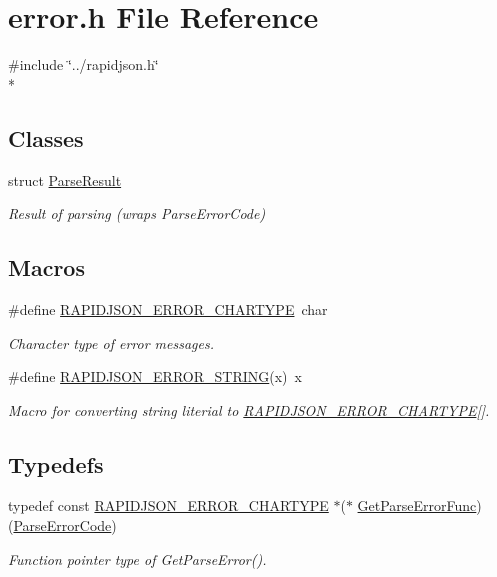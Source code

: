 \hypertarget{a00517}{}\section{error.\+h File Reference}
\label{a00517}
{\ttfamily \#include \char`\"{}../rapidjson.\+h\char`\"{}}\\*
\subsection*{Classes}
\begin{DoxyCompactItemize}
\item 
struct \hyperlink{a00230}{Parse\+Result}
\begin{DoxyCompactList}\small\item\em Result of parsing (wraps Parse\+Error\+Code) \end{DoxyCompactList}\end{DoxyCompactItemize}
\subsection*{Macros}
\begin{DoxyCompactItemize}
\item 
\#define \hyperlink{a00832_ga7e4636fd48d0148f102b8a13f0539d8c}{R\+A\+P\+I\+D\+J\+S\+O\+N\+\_\+\+E\+R\+R\+O\+R\+\_\+\+C\+H\+A\+R\+T\+Y\+PE}~char
\begin{DoxyCompactList}\small\item\em Character type of error messages. \end{DoxyCompactList}\item 
\#define \hyperlink{a00832_gabe2e1bd1349e5a7d6c1af78c05a98f0d}{R\+A\+P\+I\+D\+J\+S\+O\+N\+\_\+\+E\+R\+R\+O\+R\+\_\+\+S\+T\+R\+I\+NG}(x)~x
\begin{DoxyCompactList}\small\item\em Macro for converting string literial to \hyperlink{a00832_ga7e4636fd48d0148f102b8a13f0539d8c}{R\+A\+P\+I\+D\+J\+S\+O\+N\+\_\+\+E\+R\+R\+O\+R\+\_\+\+C\+H\+A\+R\+T\+Y\+PE}\mbox{[}\mbox{]}. \end{DoxyCompactList}\end{DoxyCompactItemize}
\subsection*{Typedefs}
\begin{DoxyCompactItemize}
\item 
typedef const \hyperlink{a00832_ga7e4636fd48d0148f102b8a13f0539d8c}{R\+A\+P\+I\+D\+J\+S\+O\+N\+\_\+\+E\+R\+R\+O\+R\+\_\+\+C\+H\+A\+R\+T\+Y\+PE} $\ast$($\ast$ \hyperlink{a00832_ga586548166441ab3ce30219cb35be2e04}{Get\+Parse\+Error\+Func}) (\hyperlink{a00832_ga8d4b32dfc45840bca189ade2bbcb6ba7}{Parse\+Error\+Code})
\begin{DoxyCompactList}\small\item\em Function pointer type of Get\+Parse\+Error(). \end{DoxyCompactList}\end{DoxyCompactItemize}
